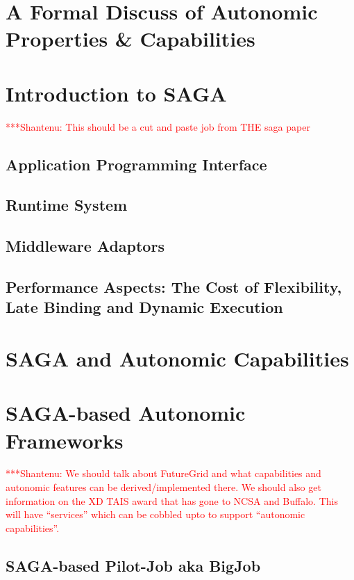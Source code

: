 \documentclass[a4paper,10pt]{article}
\newcommand{\jhanote}[1]{  {\textcolor{red}     { ***Shantenu: #1 }}}
\newcommand{\jhanote}[1]{}
\begin{document}
\section{A Formal Discuss of Autonomic Properties \& Capabilities}

\section{Introduction to SAGA}

\jhanote{This should be a cut and paste job from THE saga paper}

\subsection{Application Programming Interface}

\subsection{Runtime System}

\subsection{Middleware Adaptors}

\subsection{Performance Aspects: The Cost of Flexibility, Late Binding
  and Dynamic Execution}

\section{SAGA and Autonomic Capabilities}


\section{SAGA-based Autonomic Frameworks}

\jhanote{We should talk about FutureGrid and what capabilities and
  autonomic features can be derived/implemented there. We should also
  get information on the XD TAIS award that has gone to NCSA and
  Buffalo. This will have ``services'' which can be cobbled upto to
  support ``autonomic capabilities''.}

\subsection{SAGA-based Pilot-Job aka BigJob}
\end{document}
